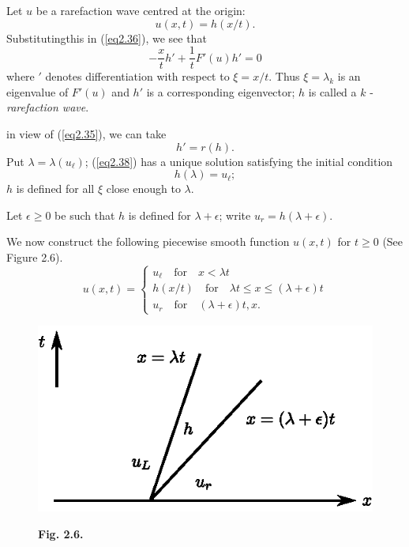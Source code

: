 Let $u$ be a rarefaction wave centred at the origin:
\begin{equation*}
u(x,t) = h (x/t).\tag{2.36}\label{eq2.36}
\end{equation*}
Substituting\pageoriginale this in (\ref{eq2.36}), we see that
\begin{equation*}
-\frac{x}{t} h' + \frac{1}{t} F' (u) h' = 0 
\tag{2.37}\label{eq2.37}
\end{equation*}
where $'$ denotes differentiation with respect to $\xi = x/t$. Thus $\xi = \lambda_k$ is an eigenvalue of $F'(u)$ and $h'$ is a corresponding eigenvector; $h$ is called a $k$ - {\em rarefaction wave}.

in view of (\ref{eq2.35}), we can take 
\begin{equation*}
h' = r(h).\tag{2.38}\label{eq2.38}
\end{equation*}
Put $\lambda = \lambda (u_\ell)$; (\ref{eq2.38}) has a unique solution satisfying the initial condition
\begin{equation*}
h(\lambda) = u_\ell;
\tag{2.39}\label{eq2.39}
\end{equation*}
$h$ is defined for all $\xi$ close enough to $\lambda$.

Let $\epsilon \geq 0$ be such that $h$ is defined for $\lambda + \epsilon$; write $u_r = h (\lambda + \epsilon)$.

We now construct the following piecewise smooth function $u(x,t)$ for $t \geq 0$ 
(See Figure 2.6).
\begin{equation*}
u(x,t) = 
\begin{cases}
u_\ell \quad \text{for} \quad x < \lambda t\\
h(x/t) \quad \text{for} \quad  \lambda t \leq x \leq (\lambda + \epsilon) t \\
u_r \quad \text{for} \quad (\lambda + \epsilon) t ,x.
\end{cases}
\tag{2.40}\label{eq2.40}
\end{equation*}

\begin{figure}[H]
\centering
\includegraphics{figures/fig2.6.eps}
\centerline{\bf Fig. 2.6.}
\end{figure}

